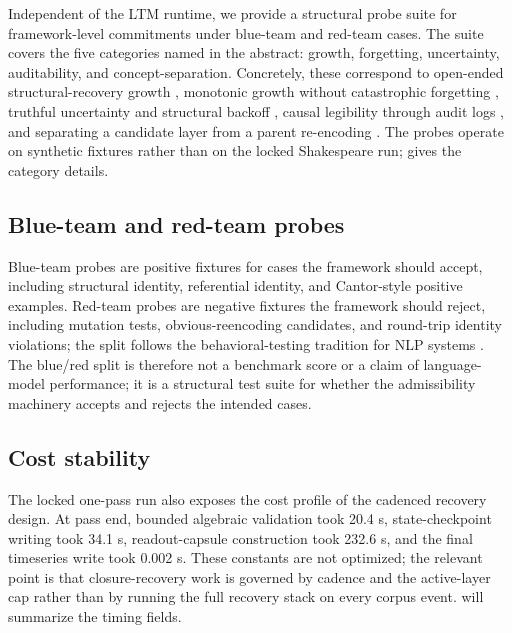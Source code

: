 \documentclass{article}
\theoremstyle{definition}
\begin{document}
Independent of the LTM runtime, we provide a structural probe suite for framework-level commitments under blue-team and red-team cases. The suite covers the five categories named in the abstract: growth, forgetting, uncertainty, auditability, and concept-separation. Concretely, these correspond to open-ended structural-recovery growth \cite{DeLaHiguera2010Grammatical}, monotonic growth without catastrophic forgetting \cite{McCloskeyCohen1989Catastrophic,Kirkpatrick2017EWC}, truthful uncertainty and structural backoff \cite{Guo2017Calibration}, causal legibility through audit logs \cite{Mitchell2019ModelCards,Gebru2018Datasheets}, and separating a candidate layer from a parent re-encoding \cite{Conneau2018Probing,HewittManning2019StructuralProbe}. The probes operate on synthetic fixtures rather than on the locked Shakespeare run;  gives the category details.

\subsection{Blue-team and red-team probes}\label{subsec:probe-split}

Blue-team probes are positive fixtures for cases the framework should accept, including structural identity, referential identity, and Cantor-style positive examples. Red-team probes are negative fixtures the framework should reject, including mutation tests, obvious-reencoding candidates, and round-trip identity violations; the split follows the behavioral-testing tradition for NLP systems \cite{Ribeiro2020CheckList,Perez2022RedTeaming}. The blue/red split is therefore not a benchmark score or a claim of language-model performance; it is a structural test suite for whether the admissibility machinery accepts and rejects the intended cases.

\subsection{Cost stability}\label{subsec:cost-stability}

The locked one-pass run also exposes the cost profile of the cadenced recovery design. At pass end, bounded algebraic validation took 20.4 s, state-checkpoint writing took 34.1 s, readout-capsule construction took 232.6 s, and the final timeseries write took 0.002 s. These constants are not optimized; the relevant point is that closure-recovery work is governed by cadence and the active-layer cap rather than by running the full recovery stack on every corpus event.  will summarize the timing fields.
\end{document}
